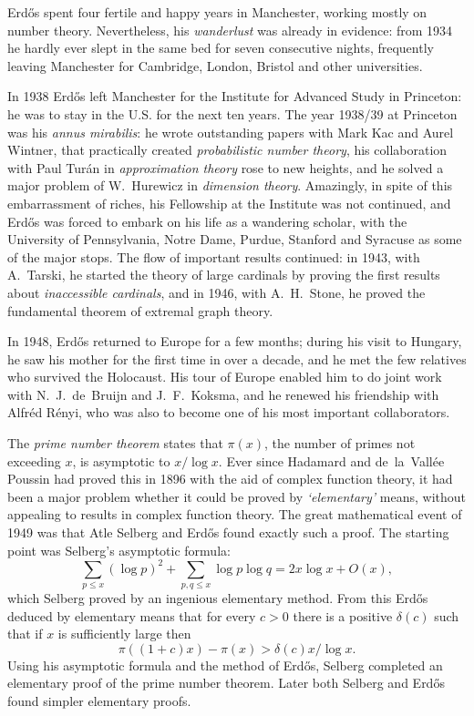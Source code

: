 Erd\H{o}s spent four fertile and happy years in Manchester, working
mostly on number theory.  Nevertheless, his {\it wanderlust} was already in
evidence:  from 1934 he hardly ever slept in the same bed for seven
consecutive nights, frequently leaving Manchester for Cambridge, 
London, Bristol
and other universities.

In 1938 Erd\H{o}s left Manchester for the Institute for Advanced Study
in Princeton:  he was to stay in the U.S. for the next ten years.
The year 1938/39 at Princeton was his {\it annus
mirabilis\/}:  he wrote outstanding papers with Mark Kac
and Aurel Wintner, that practically created {\it probabilistic number
theory}, his collaboration with Paul Tur\'an in {\it approximation
theory\/} rose to new heights, and he solved a major problem of
W.~Hurewicz in {\it dimension theory}.  Amazingly, in spite of this
embarrassment of riches, his Fellowship at the Institute was not continued,
and Erd\H{o}s was forced to embark on his life as a wandering scholar, with
the University of Pennsylvania, Notre Dame, Purdue, Stanford and Syracuse 
as some of the major stops. The flow of important results continued: in 1943, 
with A.~Tarski, he started the theory of large cardinals by proving the 
first results about {\it inaccessible cardinals}, and in 1946, with 
A.~H.~Stone, he proved the fundamental theorem of extremal graph theory.


In 1948, Erd\H{o}s returned to Europe for a few months; during his visit 
to Hungary, he saw his mother for the first time in over a decade, and 
he met the few relatives who survived the Holocaust. His tour of Europe 
enabled him to do joint work with N.~J.~de~Bruijn and J.~F.~Koksma, 
and he renewed his
friendship with Alfr\'ed R\'enyi, who was also to become one of his most
important collaborators.

The {\it prime number theorem} states that $\pi (x)$, the number of primes not
exceeding $x$, is asymptotic to $x/\log x$. Ever since Hadamard and 
de~la~Vall\'ee Poussin had proved this in 1896 with the aid of 
complex function theory, it had been a major 
problem whether it could be proved by {\it `elementary'} means, without
appealing to results in complex function theory. The great mathematical 
event of 1949 was that Atle Selberg and Erd\H{o}s found exactly such a proof.
The starting point was Selberg's asymptotic formula:
$$\sum_{p\le x} (\log p)^2 + \sum_{p,q\le x}\log p \log q =2x\log x+O(x),$$
which Selberg proved by an ingenious elementary method. From this 
Erd\H{o}s deduced by elementary means that for every $c>0$ there 
is a positive $\delta (c)$ such
that if $x$ is sufficiently large then
$$\pi ((1+c)x)-\pi (x) > \delta (c) x/\log x.$$
Using his asymptotic formula and the method of Erd\H{o}s, Selberg completed an
elementary proof of the prime number theorem. Later both Selberg and Erd\H{o}s
found simpler elementary proofs.

